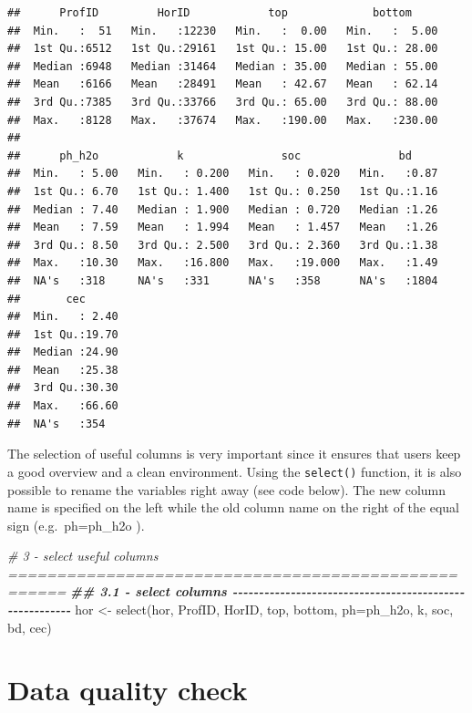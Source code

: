 \documentclass[
  10pt,
  b5paper,
  oneside]{book}
\newenvironment{Shaded}{\begin{snugshade}}{\end{snugshade}}
\newcommand{\AttributeTok}[1]{\textcolor[rgb]{0.77,0.63,0.00}{#1}}
\newcommand{\CommentTok}[1]{\textcolor[rgb]{0.56,0.35,0.01}{\textit{#1}}}
\newcommand{\DocumentationTok}[1]{\textcolor[rgb]{0.56,0.35,0.01}{\textbf{\textit{#1}}}}
\newcommand{\FunctionTok}[1]{\textcolor[rgb]{0.00,0.00,0.00}{#1}}
\newcommand{\NormalTok}[1]{#1}
\newcommand{\OtherTok}[1]{\textcolor[rgb]{0.56,0.35,0.01}{#1}}
\begin{document}
\begin{verbatim}
##      ProfID         HorID            top             bottom      
##  Min.   :  51   Min.   :12230   Min.   :  0.00   Min.   :  5.00  
##  1st Qu.:6512   1st Qu.:29161   1st Qu.: 15.00   1st Qu.: 28.00  
##  Median :6948   Median :31464   Median : 35.00   Median : 55.00  
##  Mean   :6166   Mean   :28491   Mean   : 42.67   Mean   : 62.14  
##  3rd Qu.:7385   3rd Qu.:33766   3rd Qu.: 65.00   3rd Qu.: 88.00  
##  Max.   :8128   Max.   :37674   Max.   :190.00   Max.   :230.00  
##                                                                  
##      ph_h2o            k               soc               bd      
##  Min.   : 5.00   Min.   : 0.200   Min.   : 0.020   Min.   :0.87  
##  1st Qu.: 6.70   1st Qu.: 1.400   1st Qu.: 0.250   1st Qu.:1.16  
##  Median : 7.40   Median : 1.900   Median : 0.720   Median :1.26  
##  Mean   : 7.59   Mean   : 1.994   Mean   : 1.457   Mean   :1.26  
##  3rd Qu.: 8.50   3rd Qu.: 2.500   3rd Qu.: 2.360   3rd Qu.:1.38  
##  Max.   :10.30   Max.   :16.800   Max.   :19.000   Max.   :1.49  
##  NA's   :318     NA's   :331      NA's   :358      NA's   :1804  
##       cec       
##  Min.   : 2.40  
##  1st Qu.:19.70  
##  Median :24.90  
##  Mean   :25.38  
##  3rd Qu.:30.30  
##  Max.   :66.60  
##  NA's   :354
\end{verbatim}

The selection of useful columns is very important since it ensures that users keep a good overview and a clean environment. Using the \texttt{select()} function, it is also possible to rename the variables right away (see code below). The new column name is specified on the left while the old column name on the right of the equal sign (e.g.~ph=ph\_h2o ).

\begin{Shaded}
\begin{Highlighting}[]
\CommentTok{\# 3 {-} select useful columns ====================================================}
\DocumentationTok{\#\# 3.1 {-} select columns {-}{-}{-}{-}{-}{-}{-}{-}{-}{-}{-}{-}{-}{-}{-}{-}{-}{-}{-}{-}{-}{-}{-}{-}{-}{-}{-}{-}{-}{-}{-}{-}{-}{-}{-}{-}{-}{-}{-}{-}{-}{-}{-}{-}{-}{-}{-}{-}{-}{-}{-}{-}{-}{-}{-}{-}}
\NormalTok{hor }\OtherTok{\textless{}{-}} \FunctionTok{select}\NormalTok{(hor, ProfID, HorID, top, bottom, }\AttributeTok{ph=}\NormalTok{ph\_h2o, k, soc, bd, cec)}
\end{Highlighting}
\end{Shaded}

\hypertarget{data-quality-check}{%
\section{Data quality check}\label{data-quality-check}}
\end{document}
